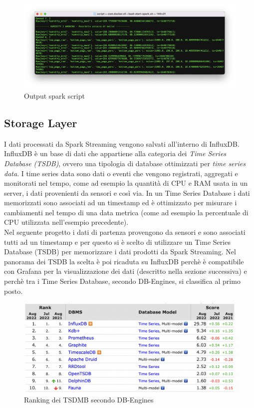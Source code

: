 \documentclass{article}
\begin{document}
\begin{figure}[H]
\includegraphics[width=1\linewidth]{Output-spark-2}
\centering
\caption*{Output spark script}
\label{fig:bytepost}
\end{figure}


 
\subsection{Storage Layer}
I dati processati da Spark Streaming vengono salvati all'interno di InfluxDB.
InfluxDB è un base di dati che appartiene alla categoria dei \textit{Time Series Database (TSDB)}, ovvero una tipologia di database ottimizzati per \textit{time series data}. I time series data sono dati o eventi che vengono registrati, aggregati e monitorati nel tempo, come ad esempio la quantità di CPU e RAM usata in un server, i dati provenienti da sensori e così via.
In un Time Series Database i dati memorizzati sono associati ad un timestamp ed è ottimizzato per misurare i cambiamenti nel tempo di una data metrica (come ad esempio la percentuale di CPU utilizzata nell'esempio precedente).\\
Nel seguente progetto i dati di partenza provengono da sensori e sono associati tutti ad un timestamp e per questo si è scelto di utilizzare un Time Series Database (TSDB) per memorizzare i dati prodotti da Spark Streaming.
Nel panorama dei TSDB la scelta è poi ricaduta su InfluxDB perchè è compatibile con Grafana per la visualizzazione dei dati (descritto nella sezione successiva) e perchè tra i Time Series Database, secondo DB-Engines, si classifica al primo posto.

\begin{figure}[H]
\includegraphics[width=1\linewidth]{Database-Rank}
\centering
\caption*{Ranking dei TSDMB secondo DB-Engines}
\label{fig:bytepost}
\end{figure}
\end{document}
